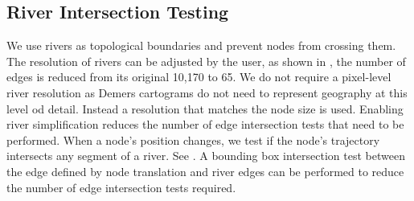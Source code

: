 \begin{algorithm}[tb!]
\end{algorithm}



\subsection{River Intersection Testing}

We use rivers as topological boundaries and prevent nodes from crossing them. The resolution of rivers can be adjusted by the user, as shown in , the number of edges is reduced from its original 10,170 to 65. We do not require a pixel-level river resolution as Demers cartograms do not need to represent geography at this level od detail. Instead a resolution that matches the node size is used. Enabling river simplification reduces the number of edge intersection tests that need to be performed. When a node's position changes, we test if the node's trajectory intersects any segment of a river. See . A bounding box intersection test between the edge defined by node translation and river edges can be performed to reduce the number of edge intersection tests required.


